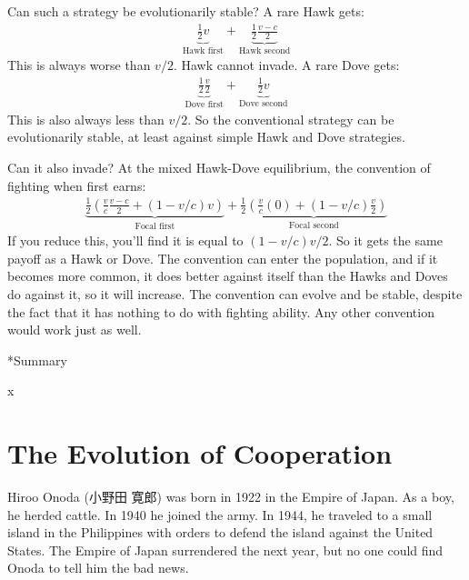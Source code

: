 \documentclass[10pt,reqno]{amsbook}
\makeatletter
\renewcommand\section{\@startsection{section}{1}
\z@{.7\linespacing\@plus\linespacing}{.5\linespacing}
{\large\bfseries\itshape}}
\numberwithin{equation}{chapter}
\makeatother
\begin{document}
Can such a strategy be evolutionarily stable? A rare Hawk gets:
\begin{align*}
	\underbrace{\frac{1}{2}v }_{\text{Hawk first}} + \underbrace{\frac{1}{2} \frac{v-c}{2} }_{\text{Hawk second}}
\end{align*}
This is always worse than $v/2$. Hawk cannot invade. A rare Dove gets:
\begin{align*}
	\underbrace{\frac{1}{2}\frac{v}{2} }_{\text{Dove first}} + \underbrace{\frac{1}{2} v }_{\text{Dove second}}
\end{align*}
This is also always less than $v/2$. So the conventional strategy can be evolutionarily stable, at least against simple Hawk and Dove strategies.

Can it also invade? At the mixed Hawk-Dove equilibrium, the convention of fighting when first earns:
\begin{align*}
	\underbrace{\frac{1}{2} \left( \frac{v}{c}\frac{v-c}{2} + (1-v/c)v \right) }_{\text{Focal first}} + \underbrace{\frac{1}{2} \left( \frac{v}{c}(0) + (1-v/c)\frac{v}{2} \right) }_{\text{Focal second}}
\end{align*}
If you reduce this, you'll find it is equal to $(1-v/c)v/2$. So it gets the same payoff as a Hawk or Dove. The convention can enter the population, and if it becomes more common, it does better against itself than the Hawks and Doves do against it, so it will increase. The convention can evolve and be stable, despite the fact that it has nothing to do with fighting ability. Any other convention would work just as well. 


\section*{Summary}

x

\def \chapterElement {C}
\chapter{The Evolution of Cooperation}

Hiroo Onoda (小野田 寛郎) was born in 1922 in the Empire of Japan. As a boy, he herded cattle. In 1940 he joined the army. In 1944, he traveled to a small island in the Philippines with orders to defend the island against the United States. The Empire of Japan surrendered the next year, but no one could find Onoda to tell him the bad news. 
\end{document}
